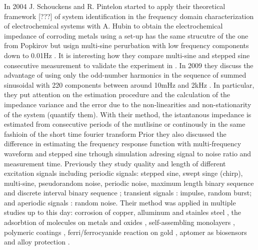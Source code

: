 In 2004 J. Schouckens and R. Pintelon started to apply their theoretical framework [???] of system identification in the frequency domain characterization of electrochemical systems with A. Hubin to obtain the electrochemical impedance of corroding metals using a set-up has the same strucutre of the one from Popkirov but usign multi-sine perurbation with low frequency components down to 0.01Hz \cite{vangheemElectrochemicalImpedanceSpectroscopy2004a}\cite{vangheemElectrochemicalImpedanceSpectroscopy2006a} \cite{blajievImprovementImpedanceMeasurement2006}. It is interesting how they compare multi-sine and stepped sine consecutive measurement to validate the experiment in \cite{vangheemInstantaneousImpedanceMeasurements2004}. In 2009 they discuss the advantage of using only the odd-number harmonics in the sequence of summed sinusoidal with 220 components between around 10mHz and 2kHz \cite{vaningelgemAdvantagesOddRandom2009}. 
In particular, they put attention on the estimation procedure and the calculation of the impedance variance and the error due to the non-linearities and non-stationarity of the system (quantify them). With their method, the istantanous impedance is estimated from consecutive periods of the mutlisine or continously in the same fashioin of the short time fourier transform
Prior \cite{schoukensBroadbandSteppedSine1999} they also discussed the difference in estimating the frequency response function with multi-frequency waveform and stepped sine trhough simulation adresing signal to noise ratio and measurement time. Previously \cite{schoukensSurveyExcitationSignals1988a} they study quality and length of different excitation signals  including periodic signals: stepped sine, swept singe (chirp), multi-sine, pseudorandom noise, periodic noise, maximum length binary sequence and discrete interval binary sequence ; transient signals : impulse, random burst; and aperiodic signals : random noise.
Their method was applied in multiple studies up to this day: corrosion of copper\cite{vaningelgemApplicationMultisineImpedance2008}, alluminum and stainles steel \cite{breugelmansOddRandomPhase2010a} \cite{alvarez-pampliegaCorrosionStudyAlrich2014} \cite{jiOddRandomPhase2018} \cite{jiElectrochemicalRamanAnalysis2020}, the adsorbtion of molecules on metals \cite{blajievPotentiodynamicEISInvestigation2008} \cite{geboesInvestigationAdsorptionMechanism2015} and oxides \cite{hauffmanMeasuringAdsorptionEthanol2012}, self-assembling monolayers \cite{hauffmanDynamicSituStudy2013}\cite{fernandezmaciaStudyElectronTransfer2014}, polymeric coatings \cite{jorcinInvestigationSelfhealingProperties2010}\cite{breugelmansOddRandomPhase2010}\cite{woutersMonitoringInitialContact2021} \cite{meeusenFEMModellingPredict2023}\cite{madelatSituMonitoringLateral2023}, ferri/ferrocyanide reaction on gold \cite{fernandezmaciaORPEISStudyTime2015}, aptomer as biosensors \cite{pauwelsNewMultisinebasedImpedimetric2016} and alloy protection \cite{meeusenUseOddRandom2018}. 

